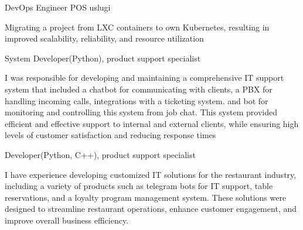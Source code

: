 

\begin{cventries}

  \cventry
    {DevOps Engineer} %
    {POS uslugi} %
    {} %
    {} %
    {
      \begin{cvitems} %
      Migrating a project from LXC containers to own Kubernetes, resulting in improved scalability, reliability, and resource utilization
      \end{cvitems}
    }



  \cventry
    {System Developer(Python), product support specialist } %
    {} %
    {} %
    {} %
    {
      \begin{cvitems}
        I was responsible for developing and maintaining a comprehensive IT support system that included a chatbot for communicating with clients,
        a PBX for handling incoming calls, integrations with a ticketing system. and bot for monitoring and controlling this system from job chat.
        This system provided efficient and effective support to internal and external clients,
        while ensuring high levels of customer satisfaction and reducing response times
      \end{cvitems}
    }

  \cventry
    {Developer(Python, C++), product support specialist} %
    {} %
    {} %
    {} %
    {
      \begin{cvitems} %
        I have experience developing customized IT solutions for the restaurant industry,
        including a variety of products such as telegram bots for IT support, table reservations, and a loyalty program management system.
        These solutions were designed to streamline restaurant operations, enhance customer engagement, and improve overall business efficiency.
      \end{cvitems}
    }


\end{cventries}
